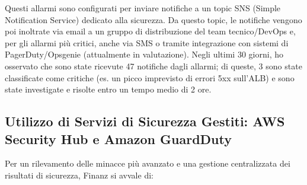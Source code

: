 Questi allarmi sono configurati per inviare notifiche a un topic SNS (Simple Notification Service) dedicato alla sicurezza. Da questo topic, le notifiche vengono poi inoltrate via email a un gruppo di distribuzione del team tecnico/DevOps e, per gli allarmi più critici, anche via SMS o tramite integrazione con sistemi di PagerDuty/Opsgenie (attualmente in valutazione).
Negli ultimi 30 giorni, ho osservato che sono state ricevute 47 notifiche dagli allarmi; di queste, 3 sono state classificate come critiche (es. un picco imprevisto di errori 5xx sull'ALB) e sono state investigate e risolte entro un tempo medio di 2 ore.

\subsection{Utilizzo di Servizi di Sicurezza Gestiti: AWS Security Hub e Amazon GuardDuty}
\label{subsec:security-hub-guardduty_cap2}
Per un rilevamento delle minacce più avanzato e una gestione centralizzata dei risultati di sicurezza, Finanz si avvale di:

